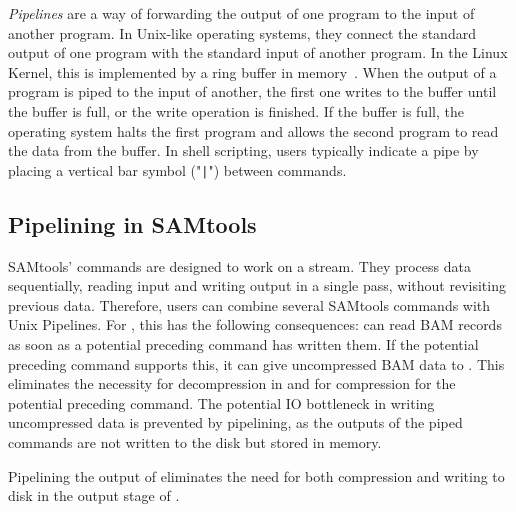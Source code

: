 \textit{Pipelines} are a way of forwarding the output of one program to the input of another program. In Unix-like operating systems, they connect the standard output of one program with the standard input of another program. In the Linux Kernel, this is implemented by a ring buffer in memory~\cite{noauthor_linuxfspipec_nodate}. When the output of a program is piped to the input of another, the first one writes to the buffer until the buffer is full, or the write operation is finished. If the buffer is full, the operating system halts the first program and allows the second program to read the data from the buffer. In shell scripting, users typically indicate a pipe by placing a vertical bar symbol ("\texttt{|}") between commands.



\subsection{Pipelining in SAMtools}
SAMtools' commands are designed to work on a stream. They process data sequentially, reading input and writing output in a single pass, without revisiting previous data.
Therefore, users can combine several SAMtools commands with Unix Pipelines. For \sort, this has the following consequences: \sort can read BAM records as soon as a potential preceding command has written them. If the potential preceding command supports this, it can give uncompressed BAM data to \sort. This eliminates the necessity for decompression in \sort and for compression for the potential preceding command. The potential IO bottleneck in writing uncompressed data is prevented by pipelining, as the outputs of the piped commands are not written to the disk but stored in memory. 

Pipelining the output of \sort eliminates the need for both compression and writing to disk in the output stage of \sort. \\


